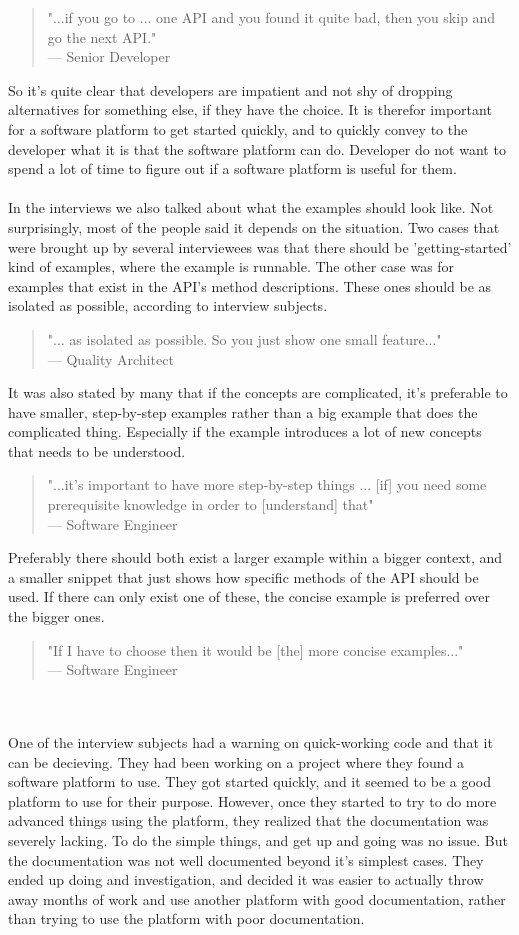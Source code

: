 \documentclass{article}
\begin{document}
\begin{quote}
"...if you go to ... one API and you found it quite bad, then you skip and go the next API." \\
--- Senior Developer
\end{quote}
So it's quite clear that developers are impatient and not shy of dropping alternatives for something else, if they have the choice. It is therefor important for a software platform to get started quickly, and to quickly convey to the developer what it is that the software platform can do. Developer do not want to spend a lot of time to figure out if a software platform is useful for them.
\\ \\
In the interviews we also talked about what the examples should look like. Not surprisingly, most of the people said it depends on the situation. Two cases that were brought up by several interviewees was that there should be 'getting-started' kind of examples, where the example is runnable. The other case was for examples that exist in the API's method descriptions. These ones should be as isolated as possible, according to interview subjects.
\begin{quote}
"... as isolated as possible. So you just show one small feature..." \\
--- Quality Architect
\end{quote}
It was also stated by many that if the concepts are complicated, it's preferable to have smaller, step-by-step examples rather than a big example that does the complicated thing. Especially if the example introduces a lot of new concepts that needs to be understood.
\begin{quote}
"...it's important to have more step-by-step things ... [if] you need some prerequisite knowledge in order to [understand] that" \\
--- Software Engineer
\end{quote}
Preferably there should both exist a larger example within a bigger context, and a smaller snippet that just shows how specific methods of the API should be used. If there can only exist one of these, the concise example is preferred over the bigger ones.
\begin{quote}
"If I have to choose then it would be [the] more concise examples..."\\
--- Software Engineer
\end{quote}
\\ \\
One of the interview subjects had a warning on quick-working code and that it can be decieving. They had been working on a project where they found a software platform to use. They got started quickly, and it seemed to be a good platform to use for their purpose. However, once they started to try to do more advanced things using the platform, they realized that the documentation was severely lacking. To do the simple things, and get up and going was no issue. But the documentation was not well documented beyond it's simplest cases. They ended up doing and investigation, and decided it was easier to actually throw away months of work and use another platform with good documentation, rather than trying to use the platform with poor documentation.
\end{document}
